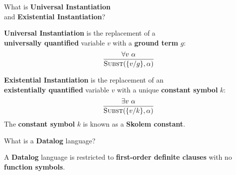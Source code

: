 
\begin{flashcard}[Question]{What is \textbf{Universal Instantiation}\\and \textbf{Existential Instantiation}?}
\begin{center}
\textbf{Universal Instantiation} is the replacement of a\\\textbf{universally quantified} variable $v$ with a \textbf{ground term} $g$:
\begin{displaymath}
\frac{\forall v ~ \alpha}{\textsc{Subst}(\{v / g \}, \alpha)}
\end{displaymath}

\textbf{Existential Instantiation} is the replacement of an\\\textbf{existentially quantified} variable $v$ with a unique \textbf{constant symbol} $k$:
\begin{displaymath}
\frac{\exists v ~ \alpha}{\textsc{Subst}(\{v / k\}, \alpha)}
\end{displaymath}
The \textbf{constant symbol} $k$ is known as a \textbf{Skolem constant}.
\end{center}
\end{flashcard}

\begin{flashcard}[Question]{What is a \textbf{Datalog} language?}
\begin{center}
A \textbf{Datalog} language is restricted to \textbf{first-order definite clauses} with no \textbf{function symbols}.
\end{center}
\end{flashcard}

